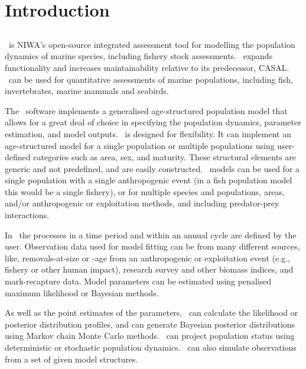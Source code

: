 \section{Introduction\label{sec:Introduction}}

\subsection{}

\CNAME\ is NIWA's open-source integrated assessment tool for modelling the population dynamics of marine species, including fishery stock assessments. \CNAME\ expands functionality and increases maintainability relative to its predecessor, CASAL. \CNAME\ can be used for quantitative assessments of marine populations, including fish, invertebrates, marine mammals and seabirds.

The \CNAME\ software implements a generalised age-structured population model that allows for a great deal of choice in specifying the population dynamics, parameter estimation, and model outputs. \CNAME\ is designed for flexibility. It can implement an age-structured model for a single population or multiple populations using user-defined categories such as area, sex, and maturity. These structural elements are generic and not predefined, and are easily constructed. \CNAME\ models can be used for a single population with a single anthropogenic event (in a fish population model this would be a single fishery), or for multiple species and populations, areas, and/or anthropogenic or exploitation methods, and including predator-prey interactions.

In \CNAME\ the processes in a time period and within an annual cycle are defined by the user. Observation data used for model fitting can be from many different sources, like, removals-at-size or -age from an anthropogenic or exploitation event (e.g., fishery or other human impact), research survey and other biomass indices, and mark-recapture data. Model parameters can be estimated using penalised maximum likelihood or Bayesian methods.

As well as the point estimates of the parameters, \CNAME\ can calculate the likelihood or posterior distribution profiles, and can generate Bayesian posterior distributions using Markov chain Monte Carlo methods. \CNAME\ can project population status using deterministic or stochastic population dynamics. \CNAME\ can also simulate observations from a set of given model structures.

